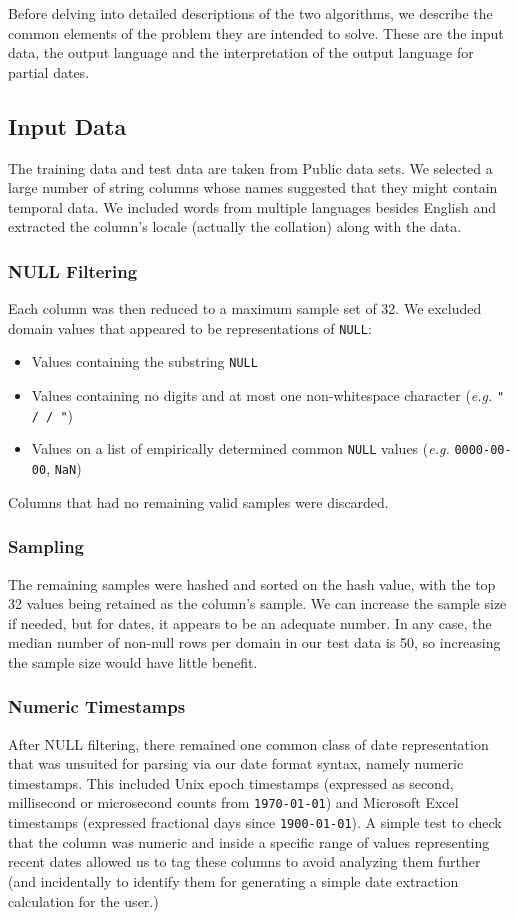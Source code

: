 Before delving into detailed descriptions of the two algorithms, we describe the common elements of the problem they are intended to solve. These are the input data, the output language and the interpretation of the output language for partial dates.

\subsection{Input Data}
The training data and test data are taken from Public data sets. We selected a large number of string columns whose names suggested that they might contain temporal data. We included words from multiple languages besides English and extracted the column's locale (actually the collation) along with the data.

\subsubsection{NULL Filtering}
Each column was then reduced to a maximum sample set of 32. We excluded domain values that appeared to be representations of \texttt{NULL}:
\begin{itemize}
\item Values containing the substring \texttt{NULL}
\item Values containing no digits and at most one non-whitespace character (\textit{e.g.} \texttt{" / / "})
\item Values on a list of empirically determined common \texttt{NULL} values (\textit{e.g.} \texttt{0000-00-00}, \texttt{NaN})
\end{itemize}
Columns that had no remaining valid samples were discarded. 

\subsubsection{Sampling}
The remaining samples were hashed and sorted on the hash value, with the top 32 values being retained as the column's sample. We can increase the sample size if needed, but for dates, it appears to be an adequate number. In any case, the median number of non-null rows per domain in our test data is 50, so increasing the sample size would have little benefit.

\subsubsection{Numeric Timestamps}
After NULL filtering, there remained one common class of date representation that was unsuited for parsing via our date format syntax, namely numeric timestamps. This included Unix epoch timestamps (expressed as second, millisecond or microsecond counts from \texttt{1970-01-01}) and Microsoft Excel timestamps (expressed fractional days since \texttt{1900-01-01}). A simple test to check that the column was numeric and inside a specific range of values representing recent dates allowed us to tag these columns to avoid analyzing them further (and incidentally to identify them for generating a simple date extraction calculation for the user.)

